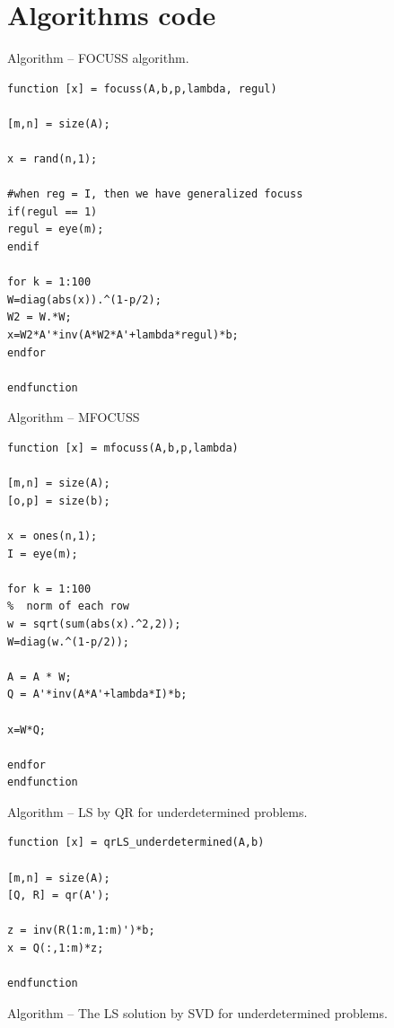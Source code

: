\documentclass[eng,openany]{mgr}
\begin{document}
\chapter{Algorithms code}
Algorithm  -- FOCUSS algorithm.\\
\begin{lstlisting}
function [x] = focuss(A,b,p,lambda, regul)

[m,n] = size(A);

x = rand(n,1);

#when reg = I, then we have generalized focuss
if(regul == 1)
regul = eye(m);
endif

for k = 1:100
W=diag(abs(x)).^(1-p/2);
W2 = W.*W;
x=W2*A'*inv(A*W2*A'+lambda*regul)*b;
endfor

endfunction

\end{lstlisting}
Algorithm  -- MFOCUSS\\
\begin{lstlisting}
function [x] = mfocuss(A,b,p,lambda)

[m,n] = size(A);
[o,p] = size(b);

x = ones(n,1);
I = eye(m);

for k = 1:100
%  norm of each row
w = sqrt(sum(abs(x).^2,2));
W=diag(w.^(1-p/2));

A = A * W;
Q = A'*inv(A*A'+lambda*I)*b;

x=W*Q;

endfor
endfunction

\end{lstlisting}

\newpage
Algorithm  -- LS by QR for underdetermined problems.\\
\begin{lstlisting}
function [x] = qrLS_underdetermined(A,b) 

[m,n] = size(A); 
[Q, R] = qr(A'); 

z = inv(R(1:m,1:m)')*b;
x = Q(:,1:m)*z;

endfunction

\end{lstlisting}

Algorithm  -- The LS solution by SVD for underdetermined problems.\\
\end{document}
